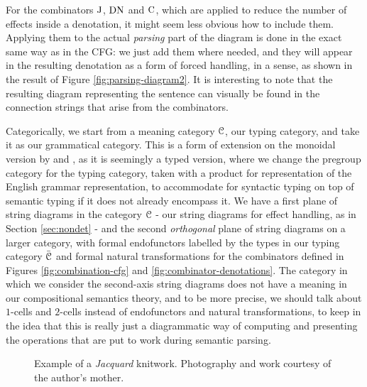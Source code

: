 For the combinators $\text{J}$, $\text{DN}$ and $\text{C}$, which are applied to
reduce the number of effects inside a denotation, it might seem less obvious
how to include them.
Applying them to the actual \emph{parsing} part of the diagram is done
in the exact same way as in the CFG: we just add them where needed, and they
will appear in the resulting denotation as a form of forced handling, in a
sense, as shown in the result of Figure \ref{fig:parsing-diagram2}.
It is interesting to note that the resulting diagram representing
the sentence can visually be found in the connection strings that arise from
the combinators.

\smallskip

Categorically, we start from a meaning category $\mathcal{C}$, our typing category, and
take it as our grammatical category.
This is a form of extension on the monoidal version by
\cite{coeckeMathematicalFoundationsCompositional2010} and
\cite{toumiHigherOrderDisCoCatPeirceLambekMontague2023}, as it is seemingly a
typed version, where we change the pregroup category for the typing category,
taken with a product for representation of the English grammar representation,
to accommodate for syntactic typing on top of semantic typing if it does not
already encompass it.
We have a first plane of string diagrams in the category
$\mathcal{C}$ - our string diagrams for effect handling, as in Section
\ref{sec:nondet} - and the second \emph{orthogonal} plane of string diagrams
on a larger category, with formal endofunctors labelled by the types in our
typing category $\bar{\mathcal{C}}$ and formal natural transformations for the
combinators defined in Figures \ref{fig:combination-cfg} and
\ref{fig:combinator-denotations}.
The category in which we consider the second-axis string diagrams does not have
a meaning in our compositional semantics theory, and to be more precise, we
should talk about $1$-cells and $2$-cells instead of endofunctors and natural
transformations, to keep in the idea that this is really just a diagrammatic
way of computing and presenting the operations that are put to work during
semantic parsing.

\begin{figure}
	\centering
	\caption{Example of a \emph{Jacquard} knitwork. Photography and work courtesy
		of the author's mother.}
	\label{fig:knitting-example}
\end{figure}

